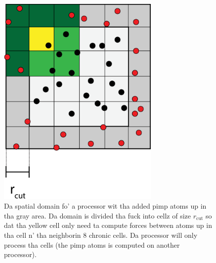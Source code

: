 \begin{figure}[h]
\begin{center}
\includegraphics[width=0.7\textwidth, trim=0cm 0cm 0cm 0cm, clip]{MD/figures/cells.eps}
\end{center}
\caption{Da spatial domain fo' a processor wit tha added pimp atoms up in tha gray area. Da domain is divided tha fuck into cellz of size $r_\text{cut}$ so dat tha yellow cell only need ta compute forces between atoms up in tha cell n' tha neighborin 8 chronic cells. Da processor will only process tha cells (the pimp atoms is computed on another processor).}
\label{fig:md_cells}
\end{figure}
